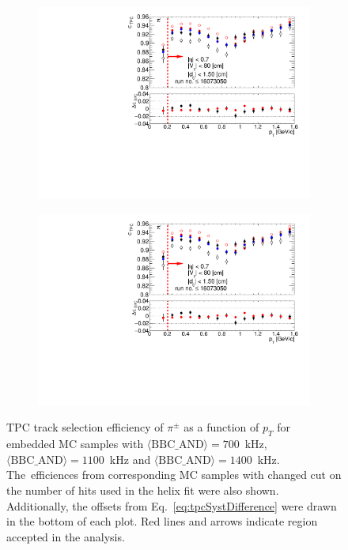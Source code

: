 \begin{figure}[h!]
	\centering
		\begin{subfigure}{.49\textwidth}
			\includegraphics[width=\linewidth,page=2]{chapters/chrgSTAR/img/tpcEffi/tpcEffi.pdf}
		\end{subfigure}
		\begin{subfigure}{.49\textwidth}
			\includegraphics[width=\linewidth,page=4]{chapters/chrgSTAR/img/tpcEffi/tpcEffi.pdf}
		\end{subfigure}
	\caption{TPC track selection efficiency of $\pi^\pm$  as a function of $p_T$  for embedded MC samples with $\langle\text{BBC\_AND}\rangle=700$~kHz, $\langle\text{BBC\_AND}\rangle=1100$~kHz and $\langle\text{BBC\_AND}\rangle=1400$~kHz. The~efficiences from corresponding MC samples with changed cut on the number of hits used in the helix fit were also shown. Additionally, the offsets  from Eq.~\eqref{eq:tpcSystDifference} were drawn in the bottom of each plot. Red lines and arrows indicate region accepted in the analysis.}
	\label{fig:systError1Dtpc}
\end{figure}
